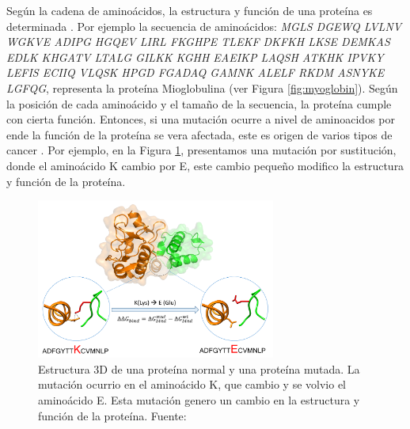 Según la cadena de aminoácidos, la estructura y función de una proteína es determinada \citep{rastogi2022bioinformatics,kihara2017protein,rangwala2010introduction}. Por ejemplo la secuencia de aminoácidos: \textit{MGLS DGEWQ LVLNV WGKVE ADIPG HGQEV LIRL FKGHPE TLEKF DKFKH LKSE DEMKAS EDLK KHGATV LTALG GILKK KGHH EAEIKP LAQSH ATKHK IPVKY LEFIS ECIIQ VLQSK HPGD FGADAQ GAMNK ALELF RKDM ASNYKE LGFQG}, representa la proteína Mioglobulina (ver Figura \ref{fig:myoglobin}). Según la posición de cada aminoácido y el tamaño de la secuencia, la proteína cumple con cierta función. Entonces, si una mutación ocurre a nivel de aminoacidos por ende la función de la proteína se vera afectada, este es origen de varios tipos de cancer \citep{xie2023neoantigens,biswas2023designing}. Por ejemplo, en la Figura \ref{fig:mutabind}, presentamos  una mutación por sustitución, donde el aminoácido K cambio por E, este cambio pequeño modifico la estructura y función de la proteína.

\begin{figure}[H]
	\centering\includegraphics[width=0.7\textwidth]{../img/proposal/mutabind}
	\caption[Estructura 3D de una proteína normal y una proteína mutada]{Estructura 3D de una proteína normal y una proteína mutada. La mutación ocurrio en el aminoácido K, que cambio y se volvio el aminoácido E. Esta mutación genero un cambio en la estructura y función de la proteína. Fuente: \cite{mutabind2024}}
	\label{fig:mutabind}
\end{figure}

